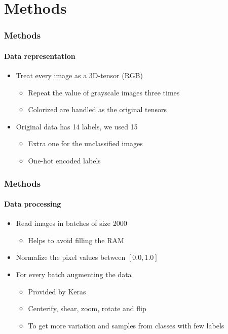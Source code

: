 \section{Methods}

\begin{frame}
	\frametitle{Methods}
	\framesubtitle{Data representation}
	\begin{itemize}
		\item Treat every image as a 3D-tensor (RGB)
			\begin{itemize}
				\item Repeat the value of grayscale images three times
				\item Colorized are handled as the original tensors
			\end{itemize}
		\item Original data has 14 labels, we used 15
			\begin{itemize}
				\item Extra one for the unclassified images
				\item One-hot encoded labels
			\end{itemize}
	\end{itemize}
\end{frame}


\begin{frame}
	\frametitle{Methods}
	\framesubtitle{Data processing}
	\begin{itemize}
		\item Read images in batches of size 2000
		\begin{itemize}
			\item Helps to avoid filling the RAM
		\end{itemize}
		\item Normalize the pixel values between $[0.0, 1.0]$
		\item For every batch augmenting the data
		\begin{itemize}
			\item Provided by Keras
			\item Centerify, shear, zoom, rotate and flip
			\item To get more variation and samples from classes with few labels
		\end{itemize}
	\end{itemize}
\end{frame}

